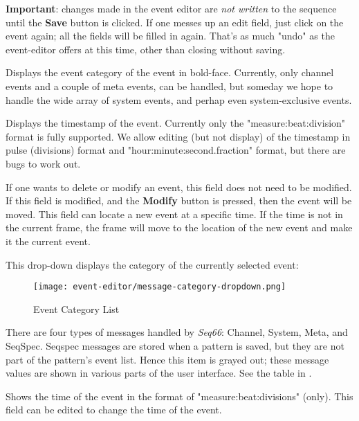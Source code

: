    \textbf{Important}: changes made in the event editor
   are \textsl{not written} to the sequence until the \textbf{Save}
   button is clicked.  If one messes up an edit field, just click on the event
   again; all the fields will be filled in again.
   That's as much "undo" as the event-editor offers at this time, other than
   closing without saving.

   \setcounter{ItemCounter}{0}      %

   Displays the event category of the event in bold-face.
   Currently, only channel events
   and a couple of meta events,
   can be handled, but someday we hope to handle the wide array of system
   events, and perhap even system-exclusive events.

   Displays the timestamp of the event.  Currently only the
   "measure:beat:division" format is fully supported.
   We allow editing (but not display) of the timestamp in
   pulse (divisions) format and "hour:minute:second.fraction" format, but
   there are bugs to work out.

   If one wants to delete or modify an event, this field does not need to be
   modified.  If this field is modified, and the \textbf{Modify}
   button is pressed, then the event will be moved.  This field can locate
   a new event at a specific time.  If the time is not in the current frame,
   the frame will move to the location of the new event and make it the current
   event.

   This drop-down displays the category of the currently selected event:

\begin{figure}[H]
   \centering
   \texttt{[image: event-editor/message-category-dropdown.png]}
   \caption{Event Category List}
   \label{fig:event_editor_category_dropdown}
\end{figure}

   There are four types of messages handled by \textsl{Seq66}:
   Channel, System, Meta, and SeqSpec. 
   Seqspec messages are stored when a pattern is saved, but they are
   not part of the pattern's event list.
   Hence this item is grayed out; these message values are shown in various
   parts of the user interface.
   See the table in .

   Shows the time of the event in the format of "measure:beat:divisions" (only).
   This field can be edited to change the time of the event.

